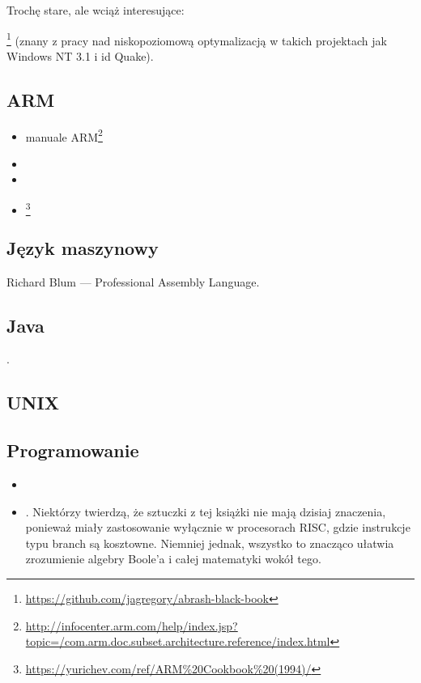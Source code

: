 Trochę stare, ale wciąż interesujące:

\MAbrash\footnote{\AlsoAvailableAs \url{https://github.com/jagregory/abrash-black-book}}
(znany z pracy nad niskopoziomową optymalizacją w takich projektach jak Windows NT 3.1 i id Quake).

\subsection{ARM}

\begin{itemize}
\item manuale ARM\footnote{\AlsoAvailableAs \url{http://infocenter.arm.com/help/index.jsp?topic=/com.arm.doc.subset.architecture.reference/index.html}}

\item \ARMSevenRef

\item \ARMSixFourRefURL

\item \ARMCookBook\footnote{\AlsoAvailableAs \url{https://yurichev.com/ref/ARM%20Cookbook%20(1994)/}}
\end{itemize}

\subsection{Język maszynowy}

Richard Blum --- Professional Assembly Language.

\subsection{Java}

\JavaBook.

\subsection{UNIX}

\TAOUP

\subsection{Programowanie}

\begin{itemize}

\item \RobPikePractice

\item \HenryWarren.
Niektórzy twierdzą, że sztuczki z tej książki nie mają dzisiaj znaczenia, ponieważ miały zastosowanie wyłącznie w procesorach \ac{RISC},
gdzie instrukcje typu branch są kosztowne.
Niemniej jednak, wszystko to znacząco ułatwia zrozumienie algebry Boole'a i całej matematyki wokół tego.

\end{itemize}

